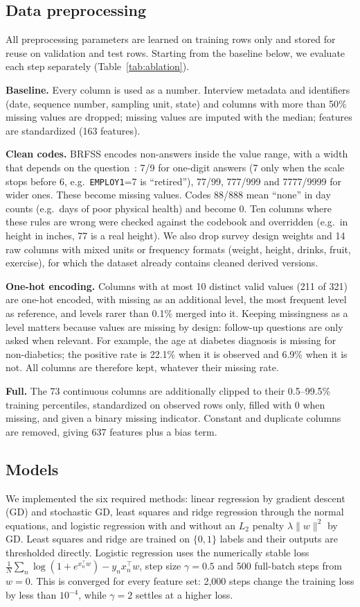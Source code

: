\documentclass[10pt,conference,compsocconf]{IEEEtran}
\begin{document}
\subsection{Data preprocessing}
\label{sec:preprocessing}
All preprocessing parameters are learned on training rows only and stored for
reuse on validation and test rows. Starting from the baseline below, we
evaluate each step separately (Table~\ref{tab:ablation}).

\textbf{Baseline.} Every column is used as a number. Interview metadata and
identifiers (date, sequence number, sampling unit, state) and columns with more
than 50\% missing values are dropped; missing values are imputed with the
median; features are standardized (163 features).

\textbf{Clean codes.} BRFSS encodes non-answers inside the value range, with a
width that depends on the question~\cite{brfss15}: 7/9 for one-digit answers
(7 only when the scale stops before 6, e.g.\ \texttt{EMPLOY1}=7 is
``retired''), 77/99, 777/999 and 7777/9999 for wider ones. These become
missing values. Codes 88/888 mean ``none'' in day counts (e.g.\ days of poor
physical health) and become 0. Ten columns where these rules are wrong were
checked against the codebook and overridden (e.g.\ in height in inches, 77 is
a real height). We also drop survey design weights and 14 raw columns with
mixed units or frequency formats (weight, height, drinks, fruit, exercise),
for which the dataset already contains cleaned derived versions.

\textbf{One-hot encoding.} Columns with at most 10 distinct valid values (211
of 321) are one-hot encoded, with missing as an additional level, the most
frequent level as reference, and levels rarer than 0.1\% merged into it.
Keeping missingness as a level matters because values are missing by design:
follow-up questions are only asked when relevant. For example, the age at
diabetes diagnosis is missing for non-diabetics; the positive rate is 22.1\%
when it is observed and 6.9\% when it is not. All columns are therefore kept,
whatever their missing rate.

\textbf{Full.} The 73 continuous columns are additionally clipped to their
0.5--99.5\% training percentiles, standardized on observed rows only, filled
with 0 when missing, and given a binary missing indicator. Constant and
duplicate columns are removed, giving 637 features plus a bias term.

\subsection{Models}
We implemented the six required methods: linear regression by gradient descent
(GD) and stochastic GD, least squares and ridge regression through the normal
equations, and logistic regression with and without an $L_2$ penalty
$\lambda\|w\|^2$ by GD. Least squares and ridge are trained on $\{0,1\}$ labels
and their outputs are thresholded directly. Logistic regression uses the
numerically stable loss $\frac{1}{N}\sum_n \log(1+e^{x_n^\top w}) - y_n
x_n^\top w$, step size $\gamma=0.5$ and 500 full-batch steps from $w=0$. This
is converged for every feature set: 2,000 steps change the training loss by
less than $10^{-4}$, while $\gamma=2$ settles at a higher loss.
\end{document}
